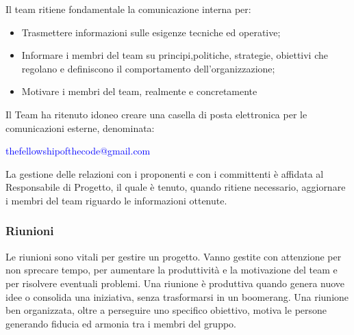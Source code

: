 Il team ritiene fondamentale la comunicazione interna per:
\begin{itemize}
\item
Trasmettere informazioni sulle esigenze tecniche ed operative;
\item
Informare i membri del team su principi,politiche, strategie, obiettivi che regolano e definiscono il comportamento dell'organizzazione;
\item
Motivare i membri del team, realmente e concretamente
\end{itemize}


Il Team ha ritenuto idoneo creare una casella di posta elettronica per le comunicazioni esterne, denominata:

\begin{center} \textcolor{blue}{thefellowshipofthecode@gmail.com} \end{center}

La gestione delle relazioni con i proponenti e con i committenti è affidata al Responsabile di Progetto, il quale è tenuto, quando ritiene necessario, aggiornare i membri del team riguardo le informazioni ottenute. 


\subsubsection{Riunioni}

Le riunioni sono vitali per gestire un progetto. Vanno gestite con attenzione per non sprecare tempo, per aumentare la produttività e la motivazione del team e per risolvere eventuali problemi. Una riunione è produttiva quando genera nuove idee o consolida una iniziativa, senza trasformarsi in un boomerang.
Una riunione ben organizzata, oltre a perseguire uno specifico obiettivo, motiva le persone generando fiducia ed armonia tra i membri del gruppo.

 
